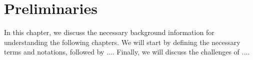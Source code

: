 \chapter{Preliminaries}\label{ch:preliminaries}
    
In this chapter, we discuss the necessary background information for understanding the following chapters. We will start by defining the necessary terms and notations, followed by .... Finally, we will discuss the challenges of ....

\lipsum[1-2]
